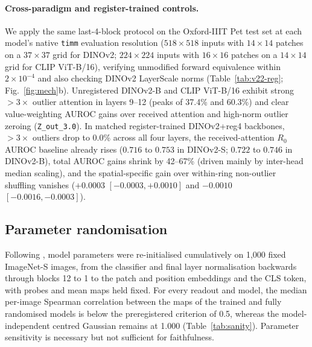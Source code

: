 \begin{table}[!htbp]
\caption{Exploratory H3 orthogonal decomposition and binary threshold sweep on 383 Oxford-IIIT Pet crops (layers 9--12; 1,000 paired bootstrap draws).}
\label{tab:v22-decomp}
\centering\footnotesize\setlength{\tabcolsep}{3pt}
\resizebox{\linewidth}{!}{}
\end{table}

\paragraph{Cross-paradigm and register-trained controls.} We apply the same last-4-block protocol on the Oxford-IIIT Pet test set at each model's native \texttt{timm} evaluation resolution ($518{\times}518$ inputs with $14{\times}14$ patches on a $37{\times}37$ grid for DINOv2; $224{\times}224$ inputs with $16{\times}16$ patches on a $14{\times}14$ grid for CLIP ViT-B/16), verifying unmodified forward equivalence within $2{\times}10^{-4}$ and also checking DINOv2 LayerScale norms (Table~\ref{tab:v22-reg}; Fig.~\ref{fig:mech}b). Unregistered DINOv2-B and CLIP ViT-B/16 exhibit strong $>3\times$ outlier attention in layers 9--12 (peaks of 37.4\% and 60.3\%) and clear value-weighting AUROC gains over received attention and high-norm outlier zeroing (\texttt{Z\_out\_3.0}). In matched register-trained DINOv2+reg4 backbones, $>3\times$ outliers drop to 0.0\% across all four layers, the received-attention $R_0$ AUROC baseline already rises ($0.716$ to $0.753$ in DINOv2-S; $0.722$ to $0.746$ in DINOv2-B), total AUROC gains shrink by 42--67\% (driven mainly by inter-head median scaling), and the spatial-specific gain over within-ring non-outlier shuffling vanishes ($+0.0003$ $[-0.0003, +0.0010]$ and $-0.0010$ $[-0.0016, -0.0003]$).

\begin{table}[!htbp]
\caption{Exploratory cross-paradigm and register-trained evaluation on 383--384 Oxford-IIIT Pet crops (95\% bootstrap CIs; 1,000 draws).}
\label{tab:v22-reg}
\centering\footnotesize\setlength{\tabcolsep}{2.5pt}
\resizebox{\linewidth}{!}{}
\end{table}

\subsection{Parameter randomisation}
\label{app:sanity}
Following \citet{adebayo2018}, model parameters were re-initialised cumulatively on 1,000 fixed ImageNet-S images, from the classifier and final layer normalisation backwards through blocks 12 to 1 to the patch and position embeddings and the CLS token, with probes and mean maps held fixed. For every readout and model, the median per-image Spearman correlation between the maps of the trained and fully randomised models is below the preregistered criterion of 0.5, whereas the model-independent centred Gaussian remains at 1.000 (Table~\ref{tab:sanity}). Parameter sensitivity is necessary but not sufficient for faithfulness.

